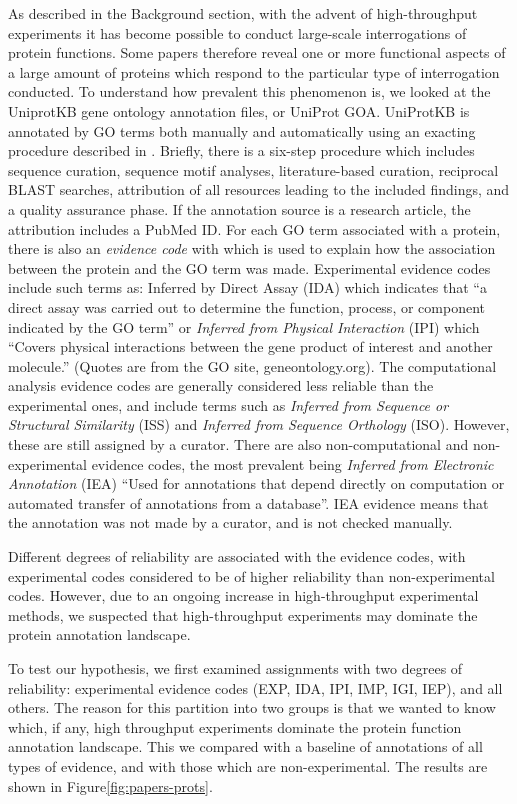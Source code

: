 \documentclass[10pt]{bmc_article}
\newenvironment{bmcformat}{\begin{raggedright}\baselineskip20pt\sloppy\setboolean{publ}{false}}{\end{raggedright}\baselineskip20pt\sloppy}
\begin{document}
\begin{bmcformat}
    As described in the Background section, with the advent of
high-throughput experiments it has become possible to conduct
large-scale interrogations of protein functions. Some papers therefore
reveal one or more functional aspects of a large amount of proteins
which respond to the particular type of interrogation conducted. To 
understand how prevalent this phenomenon is, we looked at the UniprotKB
gene ontology annotation files, or UniProt GOA. UniProtKB is annotated
by GO terms both manually and automatically using an exacting procedure
described in \cite{UniprotKB-GOA}. Briefly, there is a six-step
procedure which includes sequence curation, sequence motif analyses,
literature-based curation, reciprocal BLAST\cite{BLAST} searches,
attribution of all resources leading to the included findings, and a
quality assurance phase. If the annotation source is a research article, the
attribution includes a PubMed ID.  For each GO term associated with a
protein, there is also an \textit{evidence code} with which is used to
explain how the association between the protein and the GO term was
made. Experimental evidence codes include such terms as: Inferred by
Direct Assay (IDA) which indicates that ``a direct assay was carried out
to determine the function, process, or component indicated by the GO
term'' or \textit{Inferred from Physical Interaction} (IPI) which ``Covers
physical interactions between the gene product of interest and another
molecule.'' (Quotes are from the GO site, geneontology.org). The
computational analysis evidence codes are generally considered less
reliable than the experimental ones, and include terms such as
\textit{Inferred from Sequence or Structural Similarity} (ISS) and
\textit{Inferred from Sequence Orthology} (ISO). However, these are still
assigned by a curator. There are also
non-computational and non-experimental evidence codes, the most
prevalent being \textit{Inferred from Electronic Annotation} (IEA) ``Used
for annotations that depend directly on computation or automated
transfer of annotations from a database''. IEA evidence means that the
annotation was not made by a curator, and is not checked manually. 

Different degrees of reliability are associated with the  evidence codes, with
experimental codes considered to be of higher reliability than non-experimental
codes. However, due to an ongoing increase in high-throughput experimental
methods, we suspected that high-throughput experiments may dominate the protein
annotation landscape. 

To test our hypothesis, we first examined assignments with two degrees of reliability:
experimental evidence codes (EXP, IDA, IPI, IMP, IGI, IEP), and all others. The
reason for this partition into two groups is that we wanted to know which, if
any, high throughput experiments dominate the protein function annotation
landscape. This we compared with a baseline of annotations of all types of
evidence, and with those which are non-experimental. The results are shown in
Figure\ref{fig:papers-prots}.


\end{bmcformat}
\end{document}
